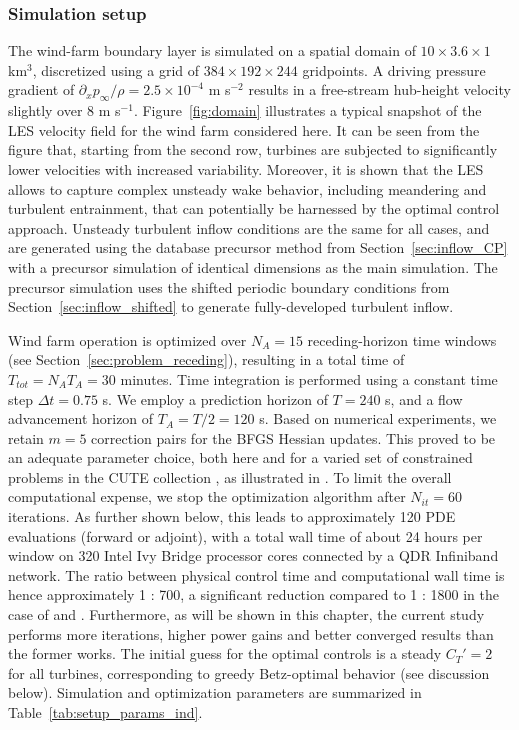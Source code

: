 \subsubsection{Simulation setup}
The wind-farm boundary layer is simulated on a spatial domain of $10 \times 3.6 \times 1$ km$^3$, discretized using a grid of $384 \times 192 \times 244$ gridpoints. A driving pressure gradient of $\partial_x p_\infty/\rho = 2.5 \times 10^{-4}$ m s$^{-2}$ results in a free-stream hub-height velocity slightly over 8 m s$^{-1}$. Figure~\ref{fig:domain} illustrates a typical snapshot of the LES velocity field for the wind farm considered here. It can be seen from the figure that, starting from the second row, turbines are subjected to significantly lower velocities with increased variability. Moreover, it is shown that the LES allows to capture complex unsteady wake behavior, including meandering and turbulent entrainment, that can potentially be harnessed by the optimal control approach. Unsteady turbulent inflow conditions are the same for all cases, and are generated using the database precursor method from Section~\ref{sec:inflow_CP} with a precursor simulation of identical dimensions as the main simulation. The precursor simulation uses the shifted periodic boundary conditions from Section~\ref{sec:inflow_shifted} to generate fully-developed turbulent inflow.  

Wind farm operation is optimized over $N_A = 15$ receding-horizon time windows (see Section~\ref{sec:problem_receding}), resulting in a total time of $T_{tot} = N_AT_A = 30$ minutes. Time integration is performed using a constant time step $\Delta t = 0.75$ s. We employ a prediction horizon of $T = 240$ s, and a flow advancement horizon of $T_A = T/2 = 120$ s. Based on numerical experiments, we retain $m = 5$ correction pairs for the BFGS Hessian updates. This proved to be an adequate parameter choice, both here and for a varied set of constrained problems in the CUTE collection \citep{bongartz1995cute}, as illustrated in \cite{byrd1995limited}. To limit the overall computational expense, we stop the optimization algorithm after $N_{it} = 60$ iterations. As further shown below, this leads to approximately 120 PDE evaluations (forward or adjoint), with a total wall time of about 24 hours per window on 320 Intel Ivy Bridge processor cores connected by a QDR Infiniband network. The ratio between physical control time and computational wall time is hence approximately 1 : 700, a significant reduction compared to 1 : 1800 in the case of \cite{goit2015optimal} and \cite{goit2016optimal}. Furthermore, as will be shown in this chapter, the current study performs more iterations, higher power gains and better converged results than the former works. The initial guess for the optimal controls is a steady $C_T' = 2$ for all turbines, corresponding to greedy Betz-optimal behavior (see discussion below). Simulation and optimization parameters are summarized in Table~\ref{tab:setup_params_ind}. 

